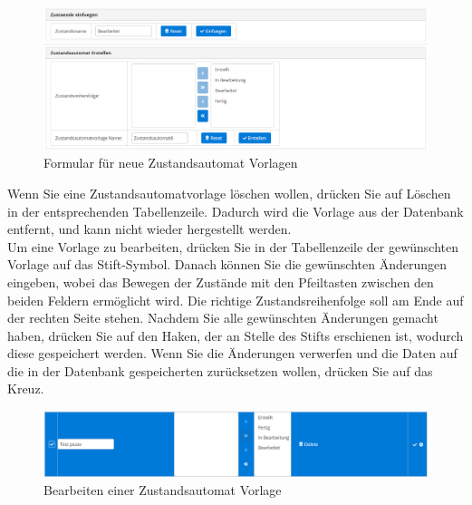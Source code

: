 \documentclass[enabledeprecatedfontcommands,fontsize=12pt,paper=a4,twoside]{scrartcl}
\begin{document}
\begin{figure}[h!]
\begin{center}
 \includegraphics[width=\textwidth]{screenshots/pk/zustandsautomatformular.png}
  \caption{Formular für neue Zustandsautomat Vorlagen}
  \label{fig:boat2}
\end{center}
\end{figure}


Wenn Sie eine Zustandsautomatvorlage löschen wollen, drücken Sie auf Löschen in der entsprechenden Tabellenzeile. Dadurch wird die Vorlage aus der Datenbank entfernt, und kann nicht wieder hergestellt werden. \\


Um eine Vorlage zu bearbeiten, drücken Sie in der Tabellenzeile der gewünschten Vorlage auf das Stift-Symbol. Danach können Sie die gewünschten Änderungen eingeben, wobei das Bewegen der Zustände mit den Pfeiltasten zwischen den beiden Feldern ermöglicht wird. Die richtige Zustandsreihenfolge soll am Ende auf der rechten Seite stehen. Nachdem Sie alle gewünschten Änderungen gemacht haben, drücken Sie auf den Haken, der an Stelle des Stifts erschienen ist, wodurch diese gespeichert werden. Wenn Sie die Änderungen verwerfen und die Daten auf die in der Datenbank gespeicherten zurücksetzen wollen, drücken Sie auf das Kreuz. \\

\begin{figure}[h!]
\begin{center}
 \includegraphics[width=\textwidth]{screenshots/pk/zustandsautomatbearbeiten.png}
  \caption{Bearbeiten einer Zustandsautomat Vorlage}
  \label{fig:boat2}
\end{center}
\end{figure}
\end{document}
